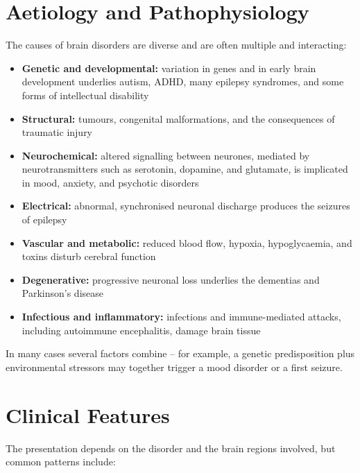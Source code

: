 \section*{Aetiology and Pathophysiology}
The causes of brain disorders are diverse and are often multiple and interacting:

\begin{itemize}
    \item \textbf{Genetic and developmental:} variation in genes and in early brain development underlies autism, ADHD, many epilepsy syndromes, and some forms of intellectual disability
    \item \textbf{Structural:} tumours, congenital malformations, and the consequences of traumatic injury
    \item \textbf{Neurochemical:} altered signalling between neurones, mediated by neurotransmitters such as serotonin, dopamine, and glutamate, is implicated in mood, anxiety, and psychotic disorders
    \item \textbf{Electrical:} abnormal, synchronised neuronal discharge produces the seizures of epilepsy
    \item \textbf{Vascular and metabolic:} reduced blood flow, hypoxia, hypoglycaemia, and toxins disturb cerebral function
    \item \textbf{Degenerative:} progressive neuronal loss underlies the dementias and Parkinson's disease
    \item \textbf{Infectious and inflammatory:} infections and immune-mediated attacks, including autoimmune encephalitis, damage brain tissue
\end{itemize}

In many cases several factors combine -- for example, a genetic predisposition plus environmental stressors may together trigger a mood disorder or a first seizure.

\section*{Clinical Features}
The presentation depends on the disorder and the brain regions involved, but common patterns include:

